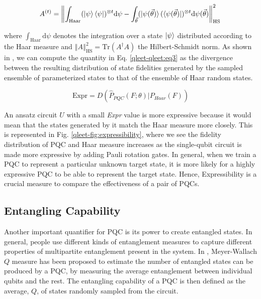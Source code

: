 \begin{equation}\label{qleet-qleet:eq3}
A^{(t)}=\left\Vert \int_\text{Haar}(\ket{\psi}\bra{\psi})^{\otimes t} \text{d}\psi-\int_{\vec{\theta}}(\ket{\psi(\vec{\theta})}(\bra{\psi(\vec{\theta})})^{\otimes t} \text{d}\psi(\vec{\theta}) \right\Vert_\text{HS}^2\,
\end{equation}

where $\int_\text{Haar}\text{d}\psi$ denotes the integration over a state $\ket{\psi}$ distributed according to the Haar measure and $\left\Vert A \right\Vert_\text{HS}^2=\text{Tr}(A^\dagger A)$ the Hilbert-Schmidt norm. As shown in \cite{10.1002/qute.201900070}, we can compute the quantity in Eq. \ref{qleet-qleet:eq3} as the divergence between the resulting distribution of state fidelities generated by the sampled ensemble of parameterized states to that of the ensemble of Haar random states.

\begin{equation}
    \text{Expr} = D(\hat{P}_{PQC}(F; \theta) | P_{Haar}(F))
\end{equation}

An ansatz circuit $U$ with a small \textit{Expr} value is more expressive because it would mean that the states generated by it match the Haar measure more closely. This is represented in Fig. \ref{qleet-fig:expressibility}, where we see the fidelity distribution of PQC and Haar measure increases as the single-qubit circuit is made more expressive by adding Pauli rotation gates. In general, when we train a PQC to represent a particular unknown target state, it is more likely for a highly expressive PQC to be able to represent the target state. Hence, Expressibility is a crucial measure to compare the effectiveness of a pair of PQCs. 

\subsection{Entangling Capability}

Another important quantifier for PQC is its power to create entangled states. In general, people use different kinds of entanglement measures to capture different properties of multipartite entanglement present in the system. In \cite{10.1002/qute.201900070}, Meyer-Wallach $Q$ measure \cite{doi:10.1063/1.1497700} has been proposed to estimate the number of entangled states can be produced by a PQC, by measuring the average entanglement between individual qubits and the rest. The entangling capability of a PQC is then defined as the average, $Q$, of states randomly sampled from the circuit.

